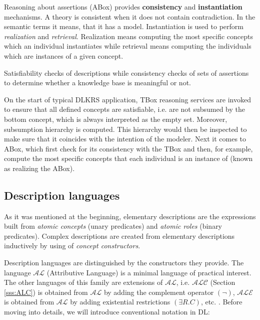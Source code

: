 Reasoning about assertions (ABox) provides \textbf{consistency} and \textbf{instantiation} mechanisms. A theory is consistent when it does not contain contradiction. In the semantic terms it means, that it has a model. Instantiation is used to perform \textit{realization} and \textit{retrieval}. Realization means computing the most specific concepts which an individual instantiates while retrieval means computing the individuals which are instances of a given concept. 

Satisfiability checks of descriptions while consistency checks of sets of assertions to determine whether a knowledge base is meaningful or not.

On the start of typical DLKRS application, TBox reasoning services are invoked to ensure that all defined concepts are satisfiable, i.e. are not subsumed by the bottom concept, which is always interpreted as the empty set. Moreover, subsumption hierarchy is computed. This hierarchy would then be inspected to make sure that it coincides with the intention of the modeler. Next it comes to ABox, which first check for its consistency with the TBox and then, for example, compute the most specific concepts that each individual is an instance of (known as realizing the ABox).

\subsection{Description languages}
\label{sub:DLs}

As it was mentioned at the beginning, elementary descriptions are the expressions built from \textit{atomic concepts} (unary predicates) and \textit{atomic roles} (binary predicates). Complex descriptions are created from elementary descriptions inductively by using of \textit{concept constructors}.

Description languages are distinguished by the constructors they provide. The language $\mathcal{AL}$ (Attributive Language) is a minimal language of practical interest. The other languages of this family are extensions of $\mathcal{AL}$, i.e. $\mathcal{ALC}$ (Section \ref{sss:ALC}) is obtained from $\mathcal{AL}$ by adding the complement operator $(\lnot)$, $\mathcal{ALE}$ is obtained from $\mathcal{AL}$ by adding existential restrictions $(\exists R.C)$, etc. \cite{BCM03, HLP08}. Before moving into details, we will introduce conventional notation in DL:

\newpage

